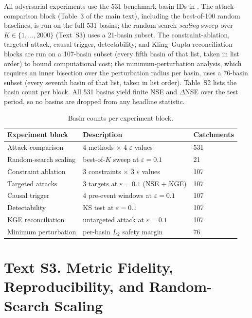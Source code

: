 \documentclass[final]{agujournal2019}
\begin{document}
All adversarial experiments use the 531 benchmark basin IDs in . The attack-comparison block (Table~3 of the main text), including the best-of-100 random baselines, is run on the full 531 basins; the random-search \emph{scaling} sweep over $K \in \{1, \dots, 2000\}$ (Text~S3) uses a 21-basin subset. The constraint-ablation, targeted-attack, causal-trigger, detectability, and Kling--Gupta reconciliation blocks are run on a 107-basin subset (every fifth basin of that list, taken in list order) to bound computational cost; the minimum-perturbation analysis, which requires an inner bisection over the perturbation radius per basin, uses a 76-basin subset (every seventh basin of that list, taken in list order). Table~S2 lists the basin count per block. All 531 basins yield finite NSE and $\Delta$NSE over the test period, so no basins are dropped from any headline statistic.

\begin{table}[ht]
\caption{Basin counts per experiment block.}
\label{tab:s2_counts}
\centering
\small
\begin{tabular}{lll}
\toprule
Experiment block & Description & Catchments \\
\midrule
Attack comparison & 4 methods $\times$ 4 $\varepsilon$ values & 531 \\
Random-search scaling & best-of-$K$ sweep at $\varepsilon = 0.1$ & 21 \\
Constraint ablation & 3 constraints $\times$ 3 $\varepsilon$ values & 107 \\
Targeted attacks & 3 targets at $\varepsilon = 0.1$ (NSE + KGE) & 107 \\
Causal trigger & 4 pre-event windows at $\varepsilon = 0.1$ & 107 \\
Detectability & KS test at $\varepsilon = 0.1$ & 107 \\
KGE reconciliation & untargeted attack at $\varepsilon = 0.1$ & 107 \\
Minimum perturbation & per-basin $L_2$ safety margin & 76 \\
\bottomrule
\end{tabular}
\end{table}

\section*{Text S3. Metric Fidelity, Reproducibility, and Random-Search Scaling}
\end{document}
